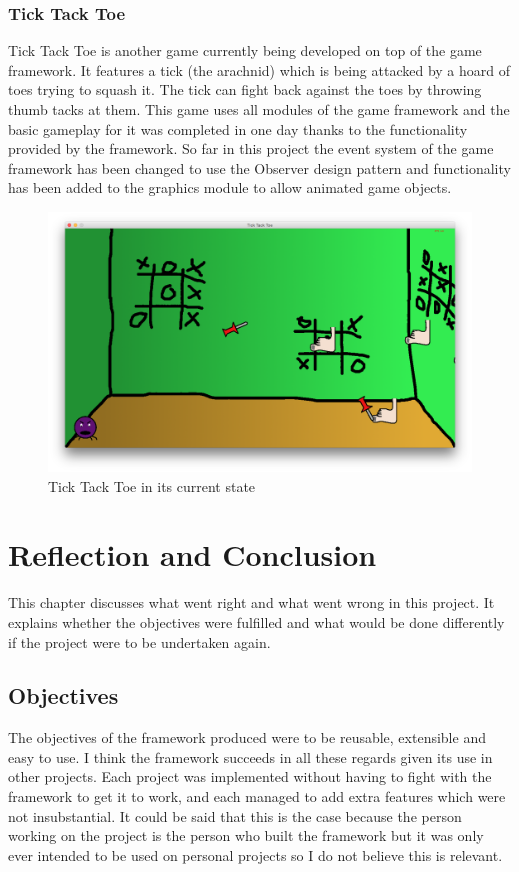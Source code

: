 \documentclass[]{report}
\begin{document}
		\subsection{Tick Tack Toe}
		Tick Tack Toe is another game currently being developed on top of the game framework. It features a tick (the arachnid) which is being attacked by a hoard of toes trying to squash it. The tick can fight back against the toes by throwing thumb tacks at them. This game uses all modules of the game framework and the basic gameplay for it was completed in one day thanks to the functionality provided by the framework. So far in this project the event system of the game framework has been changed to use the Observer design pattern and functionality has been added to the graphics module to allow animated game objects.
		
		\begin{figure}[H]
			\centering
			\includegraphics[scale=0.25]{ticktacktoe}
			\caption{Tick Tack Toe in its current state}
			\label{ticktacktoe}
		\end{figure}
	

\chapter{Reflection and Conclusion}
This chapter discusses what went right and what went wrong in this project. It explains whether the objectives were fulfilled and what would be done differently if the project were to be undertaken again.
	\section{Objectives}
	The objectives of the framework produced were to be reusable, extensible and easy to use. I think the framework succeeds in all these regards given its use in other projects. Each project was implemented without having to fight with the framework to get it to work, and each managed to add extra features which were not insubstantial. It could be said that this is the case because the person working on the project is the person who built the framework but it was only ever intended to be used on personal projects so I do not believe this is relevant.
	
\end{document}
